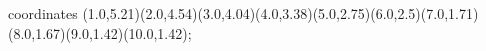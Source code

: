 					coordinates { (1.0,5.21)(2.0,4.54)(3.0,4.04)(4.0,3.38)(5.0,2.75)(6.0,2.5)(7.0,1.71)(8.0,1.67)(9.0,1.42)(10.0,1.42)};